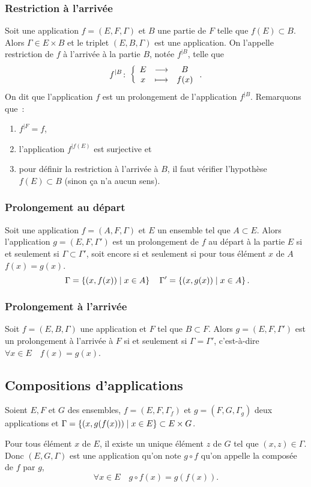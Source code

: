 \subsubsection{Restriction à l'arrivée}
\label{chap3-subsubsec:restrictionarr}
Soit une application $f=(E,F,\Gamma)$ et $B$ une partie de $F$ telle que $f(E) \subset B$. Alors $\Gamma \in E \times B$ et le triplet $(E,B,\Gamma)$ est une application. On l'appelle restriction de $f$ à l'arrivée à la partie $B$, notée $f^{|B}$, telle que
\begin{equation}
f^{|B}\colon \left\{\begin{array}{ccc} E & \longrightarrow &B\\ x & \longmapsto & f(x) \end{array} \right..
\end{equation}
On dit que l'application $f$ est un prolongement de l'application $f^{|B}$. Remarquons que~:
\begin{enumerate}
    \item $f^{|F}=f$, 
    \item l'application $f^{|f(E)}$ est surjective et 
    \item pour définir la restriction à l'arrivée à $B$, il faut vérifier l'hypothèse $f(E) \subset B$ (sinon ça n'a aucun sens).
\end{enumerate}

\subsubsection{Prolongement au départ}
\label{chap3-subsubsec:prolongementdep}
Soit une application $f=(A,F,\Gamma)$ et $E$ un ensemble tel que $A \subset E$. Alors l'application $g=(E,F,\Gamma')$ est un prolongement de $f$ au départ à la partie $E$ si et seulement si $\Gamma \subset \Gamma'$, soit encore si et seulement si pour tous élément $x$ de $A$ $f(x)=g(x)$.
\begin{equation}\
\Gamma=\left\{(x,f(x))\mathrel{}\middle|\mathrel{}x \in A\right\} \quad \Gamma'=\left\{(x,g(x))\mathrel{}\middle|\mathrel{}x \in A\right\}.
\end{equation}
\subsubsection{Prolongement à l'arrivée}
\label{chap3-subsubsec:prolongementarr}
Soit $f=(E,B,\Gamma)$ une application et $F$ tel que $B \subset F$. Alors $g=(E,F,\Gamma')$ est un prolongement à l'arrivée à $F$ si et seulement si $\Gamma = \Gamma'$, c'est-à-dire $\forall x \in E \quad f(x)=g(x)$.
%
\subsection{Compositions d'applications}
\label{chap3-subsec:compapp}
\begin{defdef}
  Soient $E,F$ et $G$ des ensembles, $f=(E,F,\Gamma_f)$ et $g=(F,G, \Gamma_g)$ deux applications et $\Gamma = \left\{(x,g(f(x)))\mathrel{}\middle|\mathrel{}x \in E\right\} \subset E \times G$.
\end{defdef}
Pour tous élément $x$ de $E$, il existe un unique élément $z$ de $G$ tel que $(x,z) \in \Gamma$. Donc $(E,G,\Gamma)$ est une application qu'on note $g \circ f$ qu'on appelle la composée de $f$ par $g$,
\begin{equation}
  \forall x \in E \quad g \circ f(x)=g(f(x)).
\end{equation}

